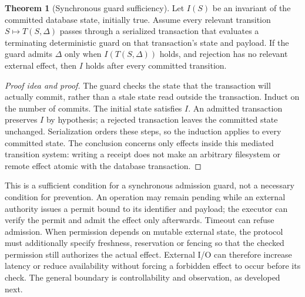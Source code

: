 \documentclass[11pt,a4paper]{article}
\theoremstyle{definition}
\newtheorem{theorem}{Theorem}[section]
\theoremstyle{remark}
\begin{document}

\begin{theorem}[Synchronous guard sufficiency]\label{thm:decidability}
Let $I(S)$ be an invariant of the committed database state, initially true.
Assume every relevant transition $S\mapsto T(S,\Delta)$ passes through a
serialized transaction that evaluates a terminating deterministic guard on
that transaction's state and payload. If the guard admits $\Delta$ only when
$I(T(S,\Delta))$ holds, and rejection has no relevant external effect, then
$I$ holds after every committed transition.
\end{theorem}

\begin{proof}[Proof idea and proof]
The guard checks the state that the transaction will actually commit, rather
than a stale state read outside the transaction. Induct on the number of
commits. The initial state satisfies $I$. An admitted transaction preserves
$I$ by hypothesis; a rejected transaction leaves the committed state
unchanged. Serialization orders these steps, so the induction applies to
every committed state. The conclusion concerns only effects inside this
mediated transition system: writing a receipt does not make an arbitrary
filesystem or remote effect atomic with the database transaction.
\end{proof}

This is a sufficient condition for a synchronous admission guard, not a
necessary condition for prevention. An operation may remain pending while
an external authority issues a permit bound to its identifier and payload;
the executor can verify the permit and admit the effect only afterwards.
Timeout can refuse admission. When permission depends on mutable external
state, the protocol must additionally specify freshness, reservation or
fencing so that the checked permission still authorizes the actual effect.
External I/O can therefore increase latency or reduce availability without
forcing a forbidden effect to occur before its check. The general boundary
is controllability and observation, as developed next.
\end{document}
